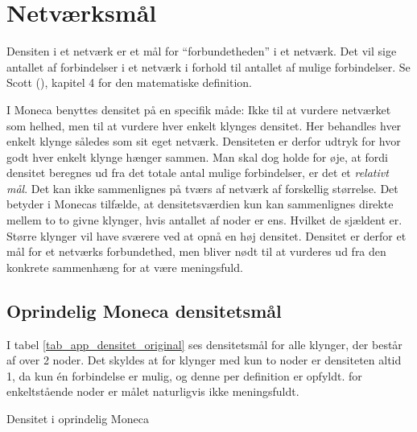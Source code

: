 
\newpage \chapter{Netværksmål \label{app_netvaerksmaal}}


Densiten i et netværk er et mål for “forbundetheden” i et netværk. Det vil sige antallet af forbindelser i et netværk i forhold til antallet af mulige forbindelser. Se Scott (\citeyear{Scott2000}), kapitel 4 for den matematiske definition. 

I Moneca benyttes densitet på en specifik måde: Ikke til at vurdere netværket som helhed, men til at vurdere hver enkelt klynges densitet. Her behandles hver enkelt klynge således som sit eget netværk. Densiteten er derfor udtryk for hvor godt hver enkelt klynge hænger sammen. Man skal dog holde for øje, at fordi densitet beregnes ud fra det totale antal mulige forbindelser, er det et \emph{relativt mål}. Det kan ikke sammenlignes på tværs af netværk af forskellig størrelse. Det betyder i Monecas tilfælde, at densitetsværdien kun kan sammenlignes direkte mellem to to givne klynger, hvis antallet af noder er ens. Hvilket de sjældent er. Større klynger vil have sværere ved at opnå en høj densitet. Densitet er derfor et mål for et netværks forbundethed, men bliver nødt til at vurderes ud fra den konkrete sammenhæng for at være meningsfuld. %

\section{Oprindelig Moneca densitetsmål}


I tabel \ref{tab_app_densitet_original} ses densitetsmål for alle klynger, der består af over 2 noder. Det skyldes at for klynger med kun to noder er densiteten altid 1, da kun én forbindelse er mulig, og denne per definition er opfyldt. for enkeltstående noder er målet naturligvis ikke meningsfuldt. 


\begin{table}[H]
  \centering
  \resizebox{5cm}{!}{%
 
}
  \caption{Densitet i oprindelig Moneca}
  \label{tab_app_densitet_original}%
\end{table}%


